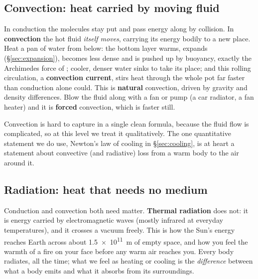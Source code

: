 \subsection{Convection: heat carried by moving fluid}

In conduction the molecules stay put and pass energy along by collision. In \textbf{convection} the
hot fluid \emph{itself moves}, carrying its energy bodily to a new place. Heat a pan of water from
below: the bottom layer warms, expands (\S\ref{sec:expansion}), becomes less dense and is pushed up by
buoyancy, exactly the Archimedes force of ; cooler, denser water sinks to take its
place; and this rolling circulation, a \textbf{convection current}, stirs heat through the whole pot
far faster than conduction alone could. This is \textbf{natural} convection, driven by gravity and
density differences. Blow the fluid along with a fan or pump (a car radiator, a fan heater) and it is
\textbf{forced} convection, which is faster still.


Convection is hard to capture in a single clean formula, because the fluid flow is complicated, so at
this level we treat it qualitatively. The one quantitative statement we do use, Newton's law of cooling
in \S\ref{sec:cooling}, is at heart a statement about convective (and radiative) loss from a warm body
to the air around it.

\subsection{Radiation: heat that needs no medium}\label{sec:radiation}

Conduction and convection both need matter. \textbf{Thermal radiation} does not: it is energy carried
by electromagnetic waves (mostly infrared at everyday temperatures), and it crosses a vacuum freely.
This is how the Sun's energy reaches Earth across about \SI{1.5e11}{m} of empty space, and how you feel
the warmth of a fire on your face before any warm air reaches you. Every body radiates, all the time;
what we feel as heating or cooling is the \emph{difference} between what a body emits and what it
absorbs from its surroundings.

